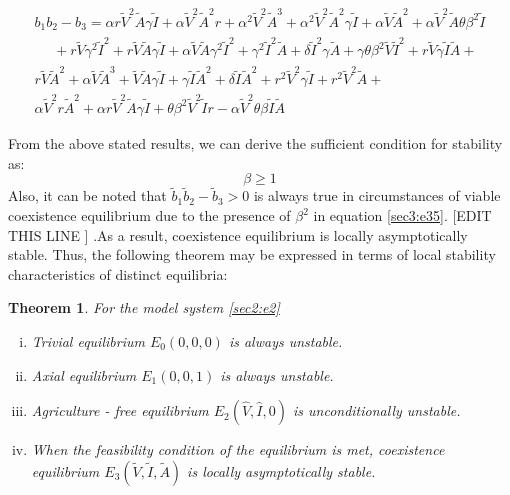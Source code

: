 \documentclass[12pt]{article}
\newtheorem{theorem}{Theorem}[section]
\numberwithin{equation}{section}
\begin{document}
\begin{enumerate}[i).]
\begin{equation}\label{sec3:e35}
\begin{split}
b_1b_2-b_3=\alpha r \tilde V^2 \tilde A \gamma \tilde I + \alpha \tilde V^2 \tilde A^2 r + \alpha^2 \tilde V^2 \tilde A^3 + \alpha^2\tilde V^2\tilde A^2\gamma \tilde I + \alpha \tilde V \tilde A^2 + \alpha \tilde V^2 \tilde A \theta \beta^2\tilde I \\
~~~~~~+ r\tilde V \gamma^2\tilde I^2 + r\tilde V\tilde A\gamma\tilde I+ \alpha \tilde V\tilde A\gamma^2\tilde I^2 + \gamma^2\tilde I^2\tilde A+\delta  \tilde I^2\gamma \tilde A
+\gamma \theta \beta^2 \tilde V \tilde I^2+ r\tilde V\gamma\tilde I \tilde A +\\
r\tilde V \tilde A^2 + \alpha \tilde V\tilde A^3+\tilde V\tilde A\gamma \tilde I+\gamma \tilde I \tilde A^2 +\delta \tilde I \tilde A^2 +r^2\tilde V^2\gamma\tilde I+r^2\tilde V^2\tilde A+\\
\alpha \tilde V^2 r \tilde A^2 + \alpha r \tilde V^2 \tilde A \gamma \tilde I+ \theta \beta^2 \tilde V^2 \tilde I r -\alpha\tilde V^2 \theta \beta \tilde I \tilde A
\end{split}
\end{equation}
\end{enumerate}

From the above stated results, we can derive the sufficient condition for stability as:
\begin{equation}\label{sec3:e36}
\beta \geq 1
\end{equation} 
Also, it can be noted that $\tilde b_1\tilde b_2-\tilde b_3>0$ is always true in circumstances of viable coexistence equilibrium due to the presence of $\beta^2$ in equation \eqref{sec3:e35}. [EDIT THIS LINE ] .As a result, coexistence equilibrium is locally asymptotically stable.
Thus, the following theorem may be expressed in terms of local stability characteristics of distinct equilibria:
\begin{theorem}\label{Theorem 3.4}
For the model system \eqref{sec2:e2}
\begin{enumerate}[i)]
\item Trivial equilibrium $E_0(0,0,0)$ is always unstable.
\item Axial equilibrium $E_1(0,0,1)$ is always unstable.
\item Agriculture - free equilibrium $E_2(\hat V,\hat I,0)$ is unconditionally unstable.
\item When the feasibility condition of the equilibrium is met, coexistence equilibrium $E_3(\tilde V,\tilde I,\tilde A)$ is locally asymptotically stable.
\end{enumerate}
 \end{theorem}
\end{document}
